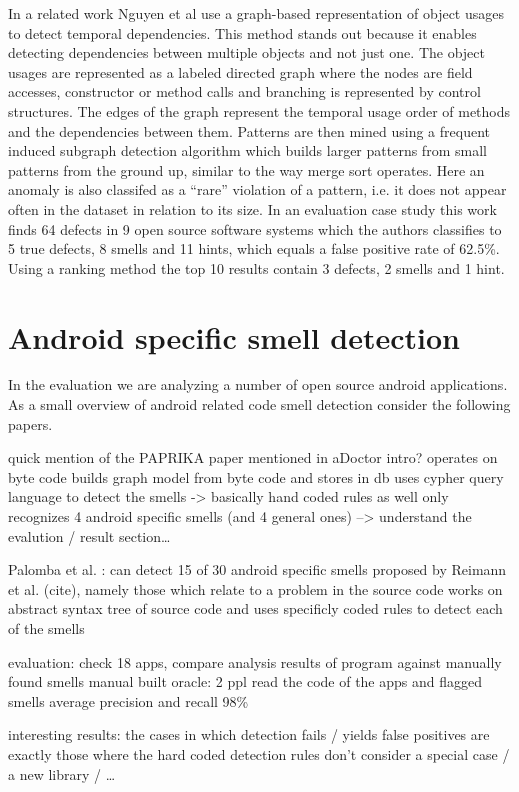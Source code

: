 In a related work Nguyen et al \cite{nguyen2009graph} use a graph-based representation of object usages to detect temporal dependencies.
This method stands out because it enables detecting dependencies between multiple objects and not just one.
The object usages are represented as a labeled directed graph where the nodes are field accesses, constructor or method calls and branching is represented by control structures.
The edges of the graph represent the temporal usage order of methods and the dependencies between them.
Patterns are then mined using a frequent induced subgraph detection algorithm which builds larger patterns from small patterns from the ground up, similar to the way merge sort operates.
Here an anomaly is also classifed as a ``rare'' violation of a pattern, i.e. it does not appear often in the dataset in relation to its size.
In an evaluation case study this work finds 64 defects in 9 open source software systems which the authors classifies to 5 true defects, 8 smells and 11 hints, which equals a false positive rate of 62.5\%.
Using a ranking method the top 10 results contain 3 defects, 2 smells and 1 hint.



\section{Android specific smell detection}

In the evaluation %
we are analyzing a number of open source android applications.
As a small overview of android related code smell detection consider the following papers.

quick mention of the PAPRIKA paper mentioned in aDoctor intro?
    operates on byte code
    builds graph model from byte code and stores in db
    uses cypher query language to detect the smells -> basically hand coded rules as well
    only recognizes 4 android specific smells (and 4 general ones)
    --> understand the evalution / result section\ldots

Palomba et al. \cite{palomba2017lightweight}:
can detect 15 of 30 android specific smells proposed by Reimann et al. (cite), namely those which relate to a problem in the source code
works on abstract syntax tree of source code and uses specificly coded rules to detect each of the smells

evaluation: check 18 apps, compare analysis results of program against manually found smells
manual built oracle: 2 ppl read the code of the apps and flagged smells
average precision and recall 98\%

interesting results: the cases in which detection fails / yields false positives are exactly those where the hard coded detection rules don't consider a special case / a new library / \ldots

